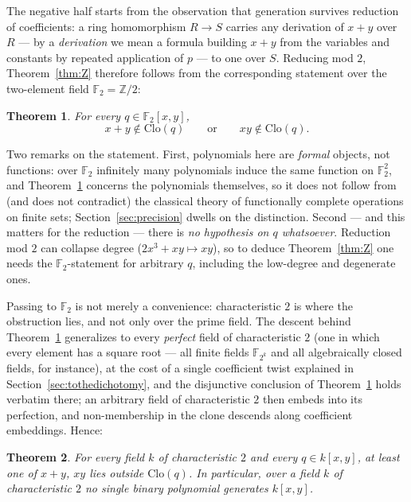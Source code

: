 \documentclass[11pt]{article}
\newtheorem{theorem}{Theorem}[section]
\theoremstyle{definition}
\theoremstyle{remark}
\newcommand{\F}{\mathbb{F}}
\newcommand{\Z}{\mathbb{Z}}
\newcommand{\Clo}{\mathrm{Clo}}
\begin{document}
The negative half starts from the observation
that generation survives reduction of coefficients: a ring
homomorphism $R \to S$ carries any derivation of $x+y$ over $R$ ---
by a \emph{derivation} we mean a formula building $x+y$ from the
variables and constants by repeated application of $p$ --- to one
over $S$.  Reducing mod $2$, Theorem~\ref{thm:Z} therefore follows
from the corresponding statement over the two-element field
$\F_2 = \Z/2$:

\begin{theorem}\label{thm:F2}
For every $q \in \F_2[x,y]$,
\[
  x + y \notin \Clo(q) \qquad\text{or}\qquad xy \notin \Clo(q).
\]
\end{theorem}

Two remarks on the statement.  First, polynomials here are
\emph{formal} objects, not functions: over $\F_2$ infinitely many
polynomials induce the same function on $\F_2^2$, and
Theorem~\ref{thm:F2} concerns the polynomials themselves, so it does
not follow from (and does not contradict) the classical theory of
functionally complete operations on finite sets;
Section~\ref{sec:precision} dwells on the distinction.  Second ---
and this matters for the reduction --- there is \emph{no hypothesis
on $q$ whatsoever}.  Reduction mod $2$ can collapse degree
($2x^3 + xy \mapsto xy$), so to deduce Theorem~\ref{thm:Z} one needs
the $\F_2$-statement for arbitrary $q$, including the
low-degree and degenerate ones.

Passing to $\F_2$ is not merely a convenience: characteristic $2$ is
where the obstruction lies, and not only over the prime
field.  The descent behind Theorem~\ref{thm:F2} generalizes to every
\emph{perfect} field of characteristic $2$ (one in which every
element has a square root --- all finite fields $\F_{2^k}$ and all
algebraically closed fields, for instance), at the cost of a single
coefficient twist explained in Section~\ref{sec:tothedichotomy}, and
the disjunctive conclusion of Theorem~\ref{thm:F2} holds verbatim
there; an arbitrary field of characteristic $2$ then embeds into its
perfection, and non-membership in the clone descends along
coefficient embeddings.  Hence:

\begin{theorem}\label{thm:char2}
For every field $k$ of characteristic $2$ and every $q \in k[x,y]$,
at least one of $x+y$, $xy$ lies outside $\Clo(q)$.  In particular,
over a field $k$ of characteristic $2$ no single binary polynomial
generates $k[x,y]$.
\end{theorem}
\end{document}
